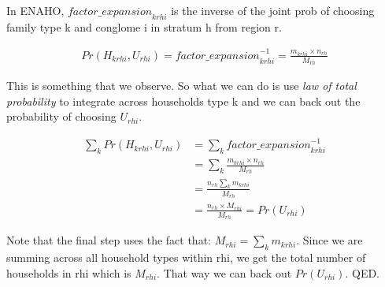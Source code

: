 In ENAHO, $\textit{factor\_expansion}_{krhi}$ is the inverse of the joint prob of choosing family type k and conglome i in stratum h from region r.

\begin{align*}
    Pr(H_{krhi}, U_{rhi}) = \textit{factor\_expansion}_{krhi}^{-1} = \frac{m_{krhi}\times n_{rh}}{M_{rh}}
\end{align*}

This is something that we observe. So what we can do is use \textit{law of total probability} to integrate across households type k and we can back out the probability of choosing $U_{rhi}$.

\begin{align*}
     \sum_{k}Pr(H_{krhi}, U_{rhi})  &= \sum_k \textit{factor\_expansion}_{krhi}^{-1} \\
                &= \sum_k \frac{m_{krhi}\times n_{rh}}{M_{rh}} \\
                &= \frac{n_{rh}\sum_k m_{krhi}}{M_{rh}} \\ 
                &= \frac{n_{rh}\times M_{rhi}}{M_{rh}} = Pr(U_{rhi})
\end{align*}

Note that the final step uses the fact that: $M_{rhi} = \sum_k m_{krhi}$. Since we are summing across all household types within rhi, we get the total number of households in rhi which is $M_{rhi}$. That way we can back out $Pr(U_{rhi})$. QED.
